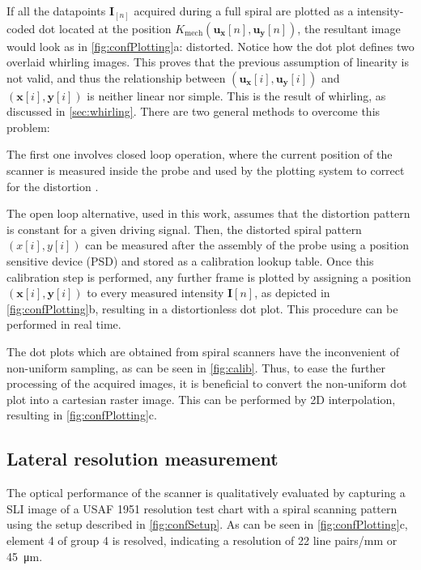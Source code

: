 \documentclass[10pt]{iopart}
\begin{document}
If all the datapoints $\mathbf{I}_{[n]}$ acquired during a full spiral are plotted as a intensity-coded dot located at the position $K_\mathrm{mech}(\mathbf{u_x}[n], \mathbf{u_y}[n])$, the resultant image would look as in \autoref{fig:confPlotting}a: distorted. Notice how the dot plot defines two overlaid whirling images. This proves that the previous assumption of linearity is not valid, and thus the relationship between $(\mathbf{u_x}[i], \mathbf{u_y}[i])$ and $(\mathbf{x}[i], \mathbf{y}[i])$ is neither linear nor simple. This is the result of whirling, as discussed in \autoref{sec:whirling}. There are two general methods to overcome this problem:

The first one involves closed loop operation, where the current position of the scanner is measured inside the probe and used by the plotting system to correct for the distortion \cite{Yeoh2014}. 

The open loop alternative, used in this work, assumes that the distortion pattern is constant for a given driving signal. Then, the distorted spiral pattern $(x[i], y[i])$ can be measured after the assembly of the probe using a position sensitive device (PSD) and stored as a calibration lookup table.
Once this calibration step is performed, any further frame is plotted by assigning a position $(\mathbf{x}[i], \mathbf{y}[i])$ to every measured intensity $\mathbf{I}[n]$, as depicted in \autoref{fig:confPlotting}b, resulting in a distortionless dot plot. This procedure can be performed in real time.

The dot plots which are obtained from spiral scanners have the inconvenient of non-uniform sampling, as can be seen in \autoref{fig:calib}. Thus, to ease the further processing of the acquired images, it is beneficial to convert the non-uniform dot plot into a cartesian raster image. This can be performed by 2D interpolation, resulting in \autoref{fig:confPlotting}c.


\subsection{Lateral resolution measurement}
The optical performance of the scanner is qualitatively evaluated by capturing a SLI image of a USAF 1951 resolution test chart with a spiral scanning pattern using the setup described in \autoref{fig:confSetup}. As can be seen in \autoref{fig:confPlotting}c, element 4 of group 4 is resolved, indicating a resolution of 22 line pairs/mm or \SI{45}{\micro\meter}. 
\end{document}
